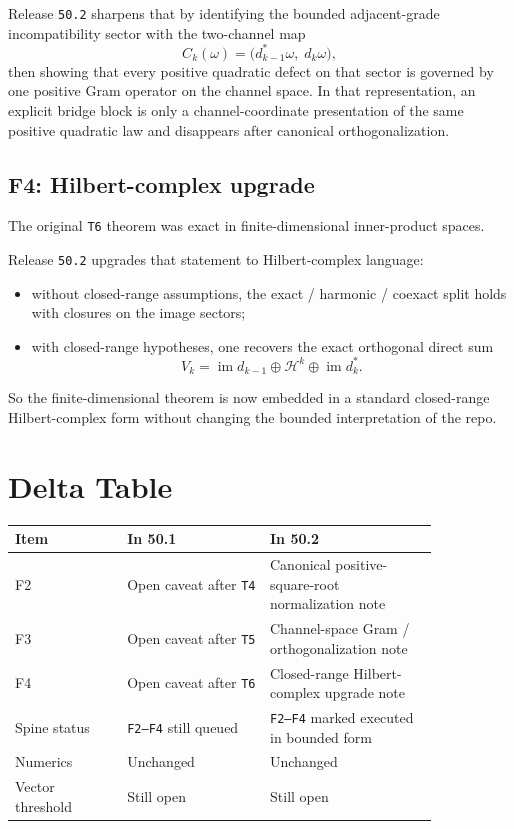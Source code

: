 \documentclass[11pt]{article}
\begin{document}
Release \texttt{50.2} sharpens that by identifying the bounded adjacent-grade incompatibility sector with the two-channel map
\[
C_k(\omega)=\bigl(d_{k-1}^*\omega,\; d_k\omega\bigr),
\]
then showing that every positive quadratic defect on that sector is governed by one positive Gram operator on the channel space. In that representation, an explicit bridge block is only a channel-coordinate presentation of the same positive quadratic law and disappears after canonical orthogonalization.

\subsection{F4: Hilbert-complex upgrade}

The original \texttt{T6} theorem was exact in finite-dimensional inner-product spaces.

Release \texttt{50.2} upgrades that statement to Hilbert-complex language:
\begin{itemize}
\item without closed-range assumptions, the exact / harmonic / coexact split holds with closures on the image sectors;
\item with closed-range hypotheses, one recovers the exact orthogonal direct sum
\[
V_k
=
\operatorname{im} d_{k-1}
\oplus
\mathcal H^k
\oplus
\operatorname{im} d_k^*.
\]
\end{itemize}

So the finite-dimensional theorem is now embedded in a standard closed-range Hilbert-complex form without changing the bounded interpretation of the repo.

\section{Delta Table}

\begin{center}
\begin{tabular}{p{0.22\linewidth}p{0.29\linewidth}p{0.33\linewidth}}
\toprule
Item & In 50.1 & In 50.2 \\
\midrule
F2 & Open caveat after \texttt{T4} & Canonical positive-square-root normalization note \\
F3 & Open caveat after \texttt{T5} & Channel-space Gram / orthogonalization note \\
F4 & Open caveat after \texttt{T6} & Closed-range Hilbert-complex upgrade note \\
Spine status & \texttt{F2--F4} still queued & \texttt{F2--F4} marked executed in bounded form \\
Numerics & Unchanged & Unchanged \\
Vector threshold & Still open & Still open \\
\bottomrule
\end{tabular}
\end{center}
\end{document}
